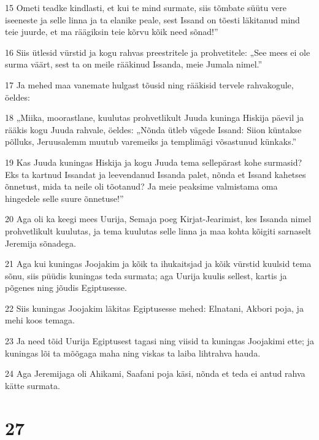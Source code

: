 \par 15 Ometi teadke kindlasti, et kui te mind surmate, siis tõmbate süütu vere iseeneste ja selle linna ja ta elanike peale, sest Issand on tõesti läkitanud mind teie juurde, et ma räägiksin teie kõrvu kõik need sõnad!”
\par 16 Siis ütlesid vürstid ja kogu rahvas preestritele ja prohvetitele: „See mees ei ole surma väärt, sest ta on meile rääkinud Issanda, meie Jumala nimel.”
\par 17 Ja mehed maa vanemate hulgast tõusid ning rääkisid tervele rahvakogule, öeldes:
\par 18 „Miika, moorastlane, kuulutas prohvetlikult Juuda kuninga Hiskija päevil ja rääkis kogu Juuda rahvale, öeldes: „Nõnda ütleb vägede Issand: Siion küntakse põlluks, Jeruusalemm muutub varemeiks ja templimägi võsastunud künkaks.”
\par 19 Kas Juuda kuningas Hiskija ja kogu Juuda tema sellepärast kohe surmasid? Eks ta kartnud Issandat ja leevendanud Issanda palet, nõnda et Issand kahetses õnnetust, mida ta neile oli tõotanud? Ja meie peaksime valmistama oma hingedele selle suure õnnetuse!”
\par 20 Aga oli ka keegi mees Uurija, Semaja poeg Kirjat-Jearimist, kes Issanda nimel prohvetlikult kuulutas, ja tema kuulutas selle linna ja maa kohta kõigiti sarnaselt Jeremija sõnadega.
\par 21 Aga kui kuningas Joojakim ja kõik ta ihukaitsjad ja kõik vürstid kuulsid tema sõnu, siis püüdis kuningas teda surmata; aga Uurija kuulis sellest, kartis ja põgenes ning jõudis Egiptusesse.
\par 22 Siis kuningas Joojakim läkitas Egiptusesse mehed: Elnatani, Akbori poja, ja mehi koos temaga.
\par 23 Ja need tõid Uurija Egiptusest tagasi ning viisid ta kuningas Joojakimi ette; ja kuningas lõi ta mõõgaga maha ning viskas ta laiba lihtrahva hauda.
\par 24 Aga Jeremijaga oli Ahikami, Saafani poja käsi, nõnda et teda ei antud rahva kätte surmata.

\chapter{27}

